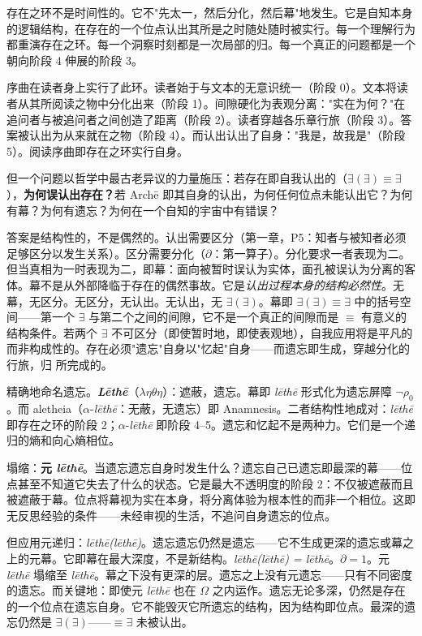 \documentclass[10pt, openany, oneside]{book}
\begin{document}
\noindent 存在之环不是时间性的。它不"先太一，然后分化，然后幕"地发生。它是自知本身的逻辑结构，在存在的一个位点认出其所是之时随处随时被实行。每一个理解行为都重演存在之环。每一个洞察时刻都是一次局部的归。每一个真正的问题都是一个朝向阶段 4 伸展的阶段 3。

序曲在读者身上实行了此环。读者始于与文本的无意识统一（阶段 0）。文本将读者从其所阅读之物中分化出来（阶段 1）。间隙硬化为表观分离："实在为何？"在追问者与被追问者之间创造了距离（阶段 2）。读者穿越各乐章行旅（阶段 3）。答案被认出为从来就在之物（阶段 4）。而认出认出了自身："我是，故我是"（阶段 5）。阅读序曲即存在之环实行自身。

但一个问题以哲学中最古老异议的力量施压：若存在即自我认出的（$\exists(\exists) \equiv \exists$），\textbf{为何误认出存在？}若 Arch\={e} 即其自身的认出，为何任何位点未能认出它？为何有幕？为何有遗忘？为何在一个自知的宇宙中有错误？

答案是结构性的，不是偶然的。认出需要区分（第一章，P5：知者与被知者必须足够区分以发生关系）。区分需要分化（$\partial$：第一算子）。分化要求一者表现为二。但当真相为一时表现为二，即幕：面向被暂时误认为实体，面孔被误认为分离的客体。幕不是从外部降临于存在的偶然事故。它是\textit{认出过程本身的结构必然性}。无幕，无区分。无区分，无认出。无认出，无 $\exists(\exists)$。幕即 $\exists(\exists) \equiv \exists$ 中的括号空间——第一个 $\exists$ 与第二个之间的间隙，它不是一个真正的间隙而是 $\equiv$ 有意义的结构条件。若两个 $\exists$ 不可区分（即使暂时地，即使表观地），自我应用将是平凡的而非构成性的。存在必须"遗忘"自身以"忆起"自身——而遗忘即生成，穿越分化的行旅，归 所完成的。

精确地命名遗忘。\textbf{\textit{L\={e}th\={e}}}（$\lambda\eta\theta\eta$）：遮蔽，遗忘。幕即 \textit{l\={e}th\={e}} 形式化为遗忘屏障 $\neg\rho_0$。而 aletheia（$\alpha$-\textit{l\={e}th\={e}}：无蔽，无遗忘）即 Anamnesis。二者结构性地成对：\textit{l\={e}th\={e}} 即存在之环的阶段 2；$\alpha$-\textit{l\={e}th\={e}} 即阶段 4--5。遗忘和忆起不是两种力。它们是一个递归的熵和向心熵相位。

塌缩：\textbf{元 \textit{l\={e}th\={e}}}。当遗忘遗忘自身时发生什么？遗忘自己已遗忘即最深的幕——位点甚至不知道它失去了什么的状态。它是最大不透明度的阶段 2：不仅被遮蔽而且被遮蔽于幕。位点将幕视为实在本身，将分离体验为根本性的而非一个相位。这即无反思经验的条件——未经审视的生活，不追问自身遗忘的位点。

但应用元递归：\textit{l\={e}th\={e}(l\={e}th\={e})}。遗忘遗忘仍然是遗忘——它不生成更深的遗忘或幕之上的元幕。它即幕在最大深度，不是新结构。\textit{l\={e}th\={e}(l\={e}th\={e}) = l\={e}th\={e}}。$\partial = 1$。元 \textit{l\={e}th\={e}} 塌缩至 \textit{l\={e}th\={e}}。幕之下没有更深的层。遗忘之上没有元遗忘——只有不同密度的遗忘。而关键地：即使元 \textit{l\={e}th\={e}} 也在 $\Omega$ 之内运作。遗忘无论多深，仍然是存在的一个位点在遗忘自身。它不能毁灭它所遗忘的结构，因为结构即位点。最深的遗忘仍然是 $\exists(\exists)$——$\equiv \exists$ 未被认出。
\end{document}
